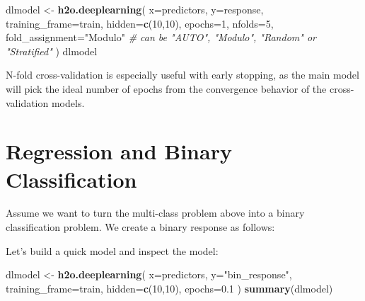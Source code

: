 \documentclass[]{book}
\newenvironment{Shaded}{\begin{snugshade}}{\end{snugshade}}
\newcommand{\CommentTok}[1]{\textcolor[rgb]{0.56,0.35,0.01}{\textit{#1}}}
\newcommand{\DataTypeTok}[1]{\textcolor[rgb]{0.13,0.29,0.53}{#1}}
\newcommand{\DecValTok}[1]{\textcolor[rgb]{0.00,0.00,0.81}{#1}}
\newcommand{\FloatTok}[1]{\textcolor[rgb]{0.00,0.00,0.81}{#1}}
\newcommand{\KeywordTok}[1]{\textcolor[rgb]{0.13,0.29,0.53}{\textbf{#1}}}
\newcommand{\NormalTok}[1]{#1}
\newcommand{\OperatorTok}[1]{\textcolor[rgb]{0.81,0.36,0.00}{\textbf{#1}}}
\newcommand{\StringTok}[1]{\textcolor[rgb]{0.31,0.60,0.02}{#1}}
\begin{document}
\begin{Shaded}
\begin{Highlighting}[]
\NormalTok{dlmodel <-}\StringTok{ }\KeywordTok{h2o.deeplearning}\NormalTok{(}
  \DataTypeTok{x=}\NormalTok{predictors,}
  \DataTypeTok{y=}\NormalTok{response, }
  \DataTypeTok{training_frame=}\NormalTok{train,}
  \DataTypeTok{hidden=}\KeywordTok{c}\NormalTok{(}\DecValTok{10}\NormalTok{,}\DecValTok{10}\NormalTok{),}
  \DataTypeTok{epochs=}\DecValTok{1}\NormalTok{,}
  \DataTypeTok{nfolds=}\DecValTok{5}\NormalTok{,}
  \DataTypeTok{fold_assignment=}\StringTok{"Modulo"} \CommentTok{# can be "AUTO", "Modulo", "Random" or "Stratified"}
\NormalTok{  )}
\NormalTok{dlmodel}
\end{Highlighting}
\end{Shaded}

N-fold cross-validation is especially useful with early stopping, as the main model will pick the ideal number of epochs from the convergence behavior of the cross-validation models.

\hypertarget{regression-and-binary-classification}{%
\section{Regression and Binary Classification}\label{regression-and-binary-classification}}

Assume we want to turn the multi-class problem above into a binary classification problem. We create a binary response as follows:

\begin{Shaded}
\end{Shaded}

Let's build a quick model and inspect the model:

\begin{Shaded}
\begin{Highlighting}[]
\NormalTok{dlmodel <-}\StringTok{ }\KeywordTok{h2o.deeplearning}\NormalTok{(}
  \DataTypeTok{x=}\NormalTok{predictors,}
  \DataTypeTok{y=}\StringTok{"bin_response"}\NormalTok{, }
  \DataTypeTok{training_frame=}\NormalTok{train,}
  \DataTypeTok{hidden=}\KeywordTok{c}\NormalTok{(}\DecValTok{10}\NormalTok{,}\DecValTok{10}\NormalTok{),}
  \DataTypeTok{epochs=}\FloatTok{0.1}
\NormalTok{)}
\KeywordTok{summary}\NormalTok{(dlmodel)}
\end{Highlighting}
\end{Shaded}
\end{document}
